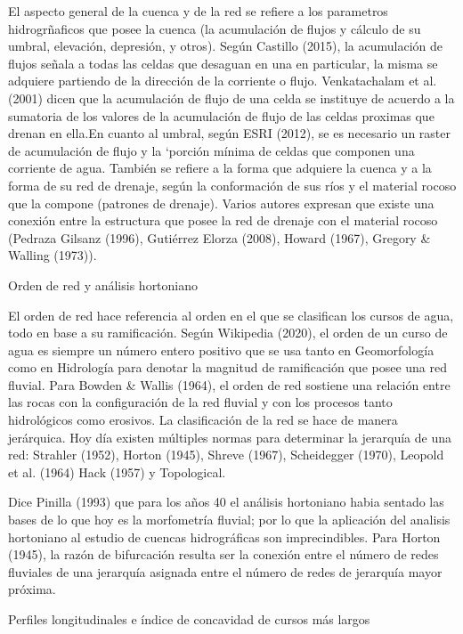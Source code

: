 \documentclass[11pt,]{article}
\begin{document}
El aspecto general de la cuenca y de la red se refiere a los parametros
hidrogrñaficos que posee la cuenca (la acumulación de flujos y cálculo
de su umbral, elevación, depresión, y otros). Según Castillo (2015), la
acumulación de flujos señala a todas las celdas que desaguan en una en
particular, la misma se adquiere partiendo de la dirección de la
corriente o flujo. Venkatachalam et al. (2001) dicen que la acumulación
de flujo de una celda se instituye de acuerdo a la sumatoria de los
valores de la acumulación de flujo de las celdas proximas que drenan en
ella.En cuanto al umbral, según ESRI (2012), se es necesario un raster
de acumulación de flujo y la `porción mínima de celdas que componen una
corriente de agua. También se refiere a la forma que adquiere la cuenca
y a la forma de su red de drenaje, según la conformación de sus ríos y
el material rocoso que la compone (patrones de drenaje). Varios autores
expresan que existe una conexión entre la estructura que posee la red de
drenaje con el material rocoso (Pedraza Gilsanz (1996), Gutiérrez Elorza
(2008), Howard (1967), Gregory \& Walling (1973)).

Orden de red y análisis hortoniano

El orden de red hace referencia al orden en el que se clasifican los
cursos de agua, todo en base a su ramificación. Según Wikipedia (2020),
el orden de un curso de agua es siempre un número entero positivo que se
usa tanto en Geomorfología como en Hidrología para denotar la magnitud
de ramificación que posee una red fluvial. Para Bowden \& Wallis (1964),
el orden de red sostiene una relación entre las rocas con la
configuración de la red fluvial y con los procesos tanto hidrológicos
como erosivos. La clasificación de la red se hace de manera jerárquica.
Hoy día existen múltiples normas para determinar la jerarquía de una
red: Strahler (1952), Horton (1945), Shreve (1967), Scheidegger (1970),
Leopold et al. (1964) Hack (1957) y Topological.

Dice Pinilla (1993) que para los años 40 el análisis hortoniano habia
sentado las bases de lo que hoy es la morfometría fluvial; por lo que la
aplicación del analisis hortoniano al estudio de cuencas hidrográficas
son imprecindibles. Para Horton (1945), la razón de bifurcación resulta
ser la conexión entre el número de redes fluviales de una jerarquía
asignada entre el número de redes de jerarquía mayor próxima.

Perfiles longitudinales e índice de concavidad de cursos más largos
\end{document}
